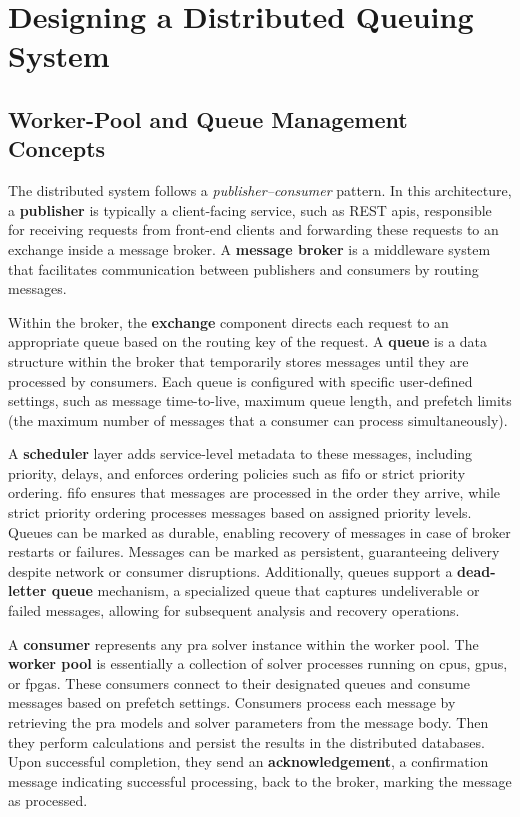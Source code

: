 {
\cleardoublepage
\let\clearpage\relax


\chapter{Designing a Distributed Queuing System}

\section{Worker-Pool and Queue Management Concepts}

The distributed system follows a \emph{publisher–consumer} pattern. In this architecture, a \textbf{publisher} is typically a client-facing service, such as REST \acrshort{api}s, responsible for receiving requests from front-end clients and forwarding these requests to an exchange inside a message broker. A \textbf{message broker} is a middleware system that facilitates communication between publishers and consumers by routing messages.

Within the broker, the \textbf{exchange} component directs each request to an appropriate queue based on the routing key of the request. A \textbf{queue} is a data structure within the broker that temporarily stores messages until they are processed by consumers. Each queue is configured with specific user-defined settings, such as message time-to-live, maximum queue length, and prefetch limits (the maximum number of messages that a consumer can process simultaneously).

A \textbf{scheduler} layer adds service-level metadata to these messages, including priority, delays, and enforces ordering policies such as \acrshort{fifo} or strict priority ordering. \acrshort{fifo} ensures that messages are processed in the order they arrive, while strict priority ordering processes messages based on assigned priority levels. Queues can be marked as durable, enabling recovery of messages in case of broker restarts or failures. Messages can be marked as persistent, guaranteeing delivery despite network or consumer disruptions. Additionally, queues support a \textbf{dead-letter queue} mechanism, a specialized queue that captures undeliverable or failed messages, allowing for subsequent analysis and recovery operations.

A \textbf{consumer} represents any \acrshort{pra} solver instance within the worker pool. The \textbf{worker pool} is essentially a collection of solver processes running on \acrshort{cpu}s, \acrshort{gpu}s, or \acrshort{fpga}s. These consumers connect to their designated queues and consume messages based on prefetch settings. Consumers process each message by retrieving the \acrshort{pra} models and solver parameters from the message body. Then they perform calculations and persist the results in the distributed databases. Upon successful completion, they send an \textbf{acknowledgement}, a confirmation message indicating successful processing, back to the broker, marking the message as processed.

}

